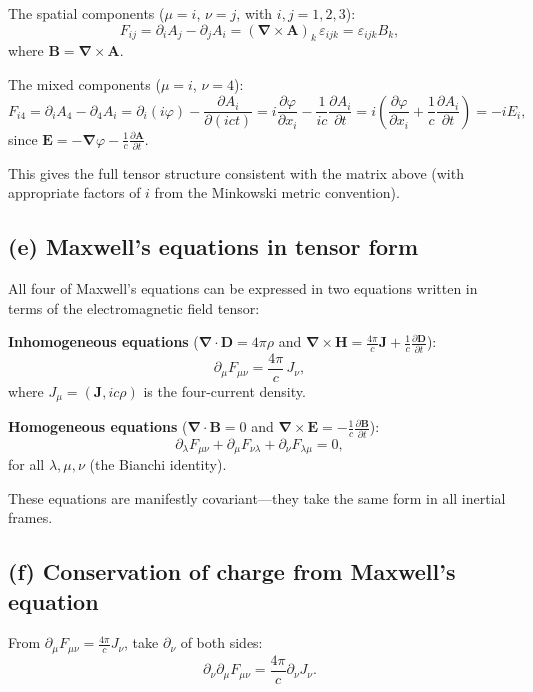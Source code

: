 \documentclass[12pt]{article}
\newcommand{\vect}[1]{\mathbf{#1}}
\newcommand{\grad}{\boldsymbol{\nabla}}
\begin{document}
The spatial components ($\mu = i$, $\nu = j$, with $i,j = 1,2,3$):
\[
F_{ij} = \partial_i A_j - \partial_j A_i = (\grad\times\vect{A})_k\,\varepsilon_{ijk} = \varepsilon_{ijk}B_k,
\]
where $\vect{B} = \grad\times\vect{A}$.

The mixed components ($\mu = i$, $\nu = 4$):
\[
F_{i4} = \partial_i A_4 - \partial_4 A_i = \partial_i(i\varphi) - \frac{\partial A_i}{\partial(ict)} = i\frac{\partial\varphi}{\partial x_i} - \frac{1}{ic}\frac{\partial A_i}{\partial t} = i\!\left(\frac{\partial\varphi}{\partial x_i} + \frac{1}{c}\frac{\partial A_i}{\partial t}\right) = -iE_i,
\]
since $\vect{E} = -\grad\varphi - \frac{1}{c}\frac{\partial\vect{A}}{\partial t}$.

This gives the full tensor structure consistent with the matrix above (with appropriate factors of $i$ from the Minkowski metric convention).

\subsection*{(e) Maxwell's equations in tensor form}

All four of Maxwell's equations can be expressed in two equations written in terms of the electromagnetic field tensor:

\textbf{Inhomogeneous equations} ($\grad\cdot\vect{D} = 4\pi\rho$ and $\grad\times\vect{H} = \frac{4\pi}{c}\vect{J} + \frac{1}{c}\frac{\partial\vect{D}}{\partial t}$):
\[
\boxed{\partial_\mu F_{\mu\nu} = \frac{4\pi}{c}\,J_\nu},
\]
where $J_\mu = (\vect{J}, ic\rho)$ is the four-current density.

\textbf{Homogeneous equations} ($\grad\cdot\vect{B} = 0$ and $\grad\times\vect{E} = -\frac{1}{c}\frac{\partial\vect{B}}{\partial t}$):
\[
\boxed{\partial_\lambda F_{\mu\nu} + \partial_\mu F_{\nu\lambda} + \partial_\nu F_{\lambda\mu} = 0},
\]
for all $\lambda,\mu,\nu$ (the Bianchi identity).

These equations are manifestly covariant---they take the same form in all inertial frames.

\subsection*{(f) Conservation of charge from Maxwell's equation}

From $\partial_\mu F_{\mu\nu} = \frac{4\pi}{c}J_\nu$, take $\partial_\nu$ of both sides:
\[
\partial_\nu\partial_\mu F_{\mu\nu} = \frac{4\pi}{c}\partial_\nu J_\nu.
\]
\end{document}
